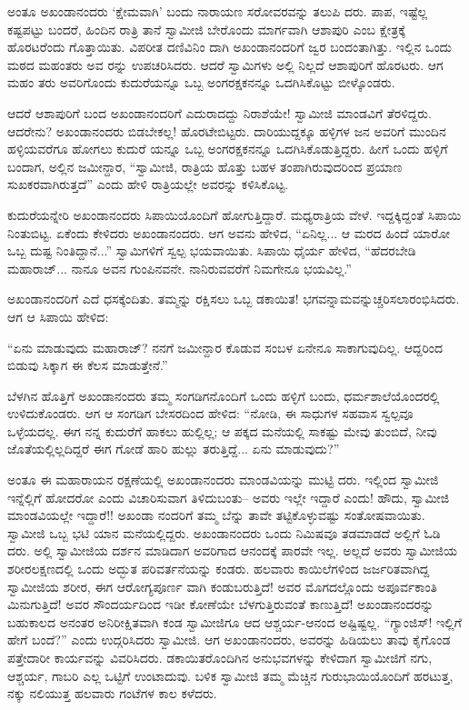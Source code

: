 ಅಂತೂ ಅಖಂಡಾನಂದರು ‘ಕ್ಷೇಮವಾಗಿ’ ಬಂದು ನಾರಾಯಣ ಸರೋವರವನ್ನು ತಲುಪಿ ದರು. ಪಾಪ, ಇಷ್ಟೆಲ್ಲ ಕಷ್ಟಪಟ್ಟು ಬಂದರೆ, ಹಿಂದಿನ ರಾತ್ರಿ ತಾನೆ ಸ್ವಾಮೀಜಿ ಬೇರೊಂದು ಮಾರ್ಗವಾಗಿ ಆಶಾಪುರಿ ಎಂಬ ಕ್ಷೇತ್ರಕ್ಕೆ ಹೊರಟರೆಂದು ಗೊತ್ತಾಯಿತು. ವಿಪರೀತ ದಣಿವಿನಿಂ ದಾಗಿ ಅಖಂಡಾನಂದರಿಗೆ ಜ್ವರ ಬಂದಂತಾಗಿತ್ತು. ಇಲ್ಲಿನ ಒಂದು ಮಠದ ಮಹಂತರು ಅವ ರನ್ನು ಉಪಚರಿಸಿದರು. ಆದರೆ ಸ್ವಾಮಿಗಳು ಅಲ್ಲಿ ನಿಲ್ಲದೆ ಆಶಾಪುರಿಗೆ ಹೊರಟರು. ಆಗ ಮಹಂ ತರು ಅವರಿಗೊಂದು ಕುದುರೆಯನ್ನೂ ಒಬ್ಬ ಅಂಗರಕ್ಷಕನನ್ನೂ ಒದಗಿಸಿಕೊಟ್ಟು ಬೀಳ್ಕೊಂಡರು.

ಆದರೆ ಆಶಾಪುರಿಗೆ ಬಂದ ಅಖಂಡಾನಂದರಿಗೆ ಎದುರಾದದ್ದು ನಿರಾಶೆಯೇ! ಸ್ವಾಮೀಜಿ ಮಾಂಡವಿಗೆ ತೆರಳಿದ್ದರು. ಆದರೇನು? ಅಖಂಡಾನಂದರು ಬಿಡಬೇಕಲ್ಲ! ಹೊರಟೇಬಿಟ್ಟರು. ದಾರಿಯುದ್ದಕ್ಕೂ ಹಳ್ಳಿಗಳ ಜನ ಅವರಿಗೆ ಮುಂದಿನ ಹಳ್ಳಿಯವರೆಗೂ ಹೋಗಲು ಕುದುರೆ ಯನ್ನೂ ಒಬ್ಬ ಅಂಗರಕ್ಷಕನನ್ನೂ ಒದಗಿಸಿಕೊಡುತ್ತಿದ್ದರು. ಹೀಗೆ ಒಂದು ಹಳ್ಳಿಗೆ ಬಂದಾಗ, ಅಲ್ಲಿನ ಜಮೀನ್ದಾರ, “ಸ್ವಾಮೀಜಿ, ರಾತ್ರಿಯ ಹೊತ್ತು ಬಹಳ ತಂಪಾಗಿರುವುದರಿಂದ ಪ್ರಯಾಣ ಸುಖಕರವಾಗಿರುತ್ತದೆ” ಎಂದು ಹೇಳಿ ರಾತ್ರಿಯಲ್ಲೇ ಅವರನ್ನು ಕಳಿಸಿಕೊಟ್ಟ.

ಕುದುರೆಯನ್ನೇರಿ ಅಖಂಡಾನಂದರು ಸಿಪಾಯಿಯೊಂದಿಗೆ ಹೋಗುತ್ತಿದ್ದಾರೆ. ಮಧ್ಯರಾತ್ರಿಯ ವೇಳೆ. ಇದ್ದಕ್ಕಿದ್ದಂತೆ ಸಿಪಾಯಿ ನಿಂತುಬಿಟ್ಟ. ಏಕೆಂದು ಕೇಳಿದರು ಅಖಂಡಾನಂದರು. ಆಗ ಅವನು ಹೇಳಿದ, “ಏನಿಲ್ಲ... ಆ ಮರದ ಹಿಂದೆ ಯಾರೋ ಒಬ್ಬ ದುಷ್ಟ ನಿಂತಿದ್ದಾನೆ...” ಸ್ವಾಮಿಗಳಿಗೆ ಸ್ವಲ್ಪ ಭಯವಾಯಿತು. ಸಿಪಾಯಿ ಧೈರ್ಯ ಹೇಳಿದ, “ಹೆದರಬೇಡಿ ಮಹಾರಾಜ್... ನಾನೂ ಅವನ ಗುಂಪಿನವನೇ. ನಾನಿರುವವರೆಗೆ ನಿಮಗೇನೂ ಭಯವಿಲ್ಲ.”

ಅಖಂಡಾನಂದರಿಗೆ ಎದೆ ಧಸಕ್ಕೆಂದಿತು. ತಮ್ಮನ್ನು ರಕ್ಷಿಸಲು ಒಬ್ಬ ಡಕಾಯಿತ! ಭಗವನ್ನಾಮವನ್ನುಚ್ಚರಿಸಲಾರಂಭಿಸಿದರು. ಆಗ ಆ ಸಿಪಾಯಿ ಹೇಳಿದ:

“ಏನು ಮಾಡುವುದು ಮಹಾರಾಜ್? ನನಗೆ ಜಮೀನ್ದಾರ ಕೊಡುವ ಸಂಬಳ ಏನೇನೂ ಸಾಕಾಗುವುದಿಲ್ಲ. ಆದ್ದರಿಂದ ಬಿಡುವು ಸಿಕ್ಕಾಗ ಈ ಕೆಲಸ ಮಾಡುತ್ತೇನೆ.”

ಬೆಳಗಿನ ಹೊತ್ತಿಗೆ ಅಖಂಡಾನಂದರು ತಮ್ಮ ಸಂಗಡಿಗನೊಂದಿಗೆ ಒಂದು ಹಳ್ಳಿಗೆ ಬಂದು, ಧರ್ಮಶಾಲೆಯೊಂದರಲ್ಲಿ ಉಳಿದುಕೊಂಡರು. ಆಗ ಆ ಸಂಗಡಿಗ ಬೇಸರದಿಂದ ಹೇಳಿದ: “ನೋಡಿ, ಈ ಸಾಧುಗಳ ಸಹವಾಸ ಸ್ವಲ್ಪವೂ ಒಳ್ಳೆಯದಲ್ಲ. ಈಗ ನನ್ನ ಕುದುರೆಗೆ ಹಾಕಲು ಹುಲ್ಲಿಲ್ಲ; ಆ ಪಕ್ಕದ ಮನೆಯಲ್ಲಿ ಸಾಕಷ್ಟು ಮೇವು ತುಂಬಿದೆ, ನೀವು ಜೊತೆಯಲ್ಲಿಲ್ಲದಿದ್ದರೆ ಈಗ ಗೋಡೆ ಹಾರಿ ಹುಲ್ಲು ತರುತ್ತಿದ್ದೆ... ಏನು ಮಾಡುವುದು?”

ಅಂತೂ ಈ ಮಹಾರಾಯನ ರಕ್ಷಣೆಯಲ್ಲಿ ಅಖಂಡಾನಂದರು ಮಾಂಡವಿಯನ್ನು ಮುಟ್ಟಿ ದರು. ಇಲ್ಲಿಂದ ಸ್ವಾಮೀಜಿ ಇನ್ನೆಲ್ಲಿಗೆ ಹೋದರೋ ಎಂದು ವಿಚಾರಿಸುವಾಗ ತಿಳಿದುಬಂತು– ಅವರು ಇಲ್ಲೇ ಇದ್ದಾರೆ ಎಂದು! ಹೌದು, ಸ್ವಾಮೀಜಿ ಮಾಂಡವಿಯಲ್ಲೇ ಇದ್ದಾರೆ!! ಅಖಂಡಾ ನಂದರಿಗೆ ತಮ್ಮ ಬೆನ್ನು ತಾವೇ ತಟ್ಟಿಕೊಳ್ಳುವಷ್ಟು ಸಂತೋಷವಾಯಿತು. ಸ್ವಾಮೀಜಿ ಒಬ್ಬ ಭಟಿ ಯಾನ ಮನೆಯಲ್ಲಿದ್ದರು. ಅಖಂಡಾನಂದರು ಒಂದು ನಿಮಿಷವೂ ತಡಮಾಡದೆ ಅಲ್ಲಿಗೆ ಓಡಿ ದರು. ಅಲ್ಲಿ ಸ್ವಾಮೀಜಿಯ ದರ್ಶನ ಮಾಡಿದಾಗ ಅವರಿಗಾದ ಆನಂದಕ್ಕೆ ಪಾರವೇ ಇಲ್ಲ. ಅಲ್ಲದೆ ಅವರು ಸ್ವಾಮೀಜಿಯ ಶರೀರಲಕ್ಷಣದಲ್ಲಿ ಒಂದು ಅದ್ಭುತ ಪರಿವರ್ತನೆಯನ್ನು ಕಂಡರು. ಹಲವಾರು ಕಾಯಿಲೆಗಳಿಂದ ಜರ್ಜರಿತವಾಗಿದ್ದ ಸ್ವಾಮೀಜಿಯ ಶರೀರ, ಈಗ ಆರೋಗ್ಯಪೂರ್ಣ ವಾಗಿ ಕಂಡುಬರುತ್ತಿದೆ! ಅವರ ಮೊಗದಲ್ಲೊಂದು ಅಪೂರ್ವಕಾಂತಿ ಮಿನುಗುತ್ತಿದೆ! ಅವರ ಸೌಂದರ್ಯದಿಂದ ಇಡೀ ಕೋಣೆಯೇ ಬೆಳಗುತ್ತಿರುವಂತೆ ಕಾಣುತ್ತಿದೆ! ಅಖಂಡಾನಂದರನ್ನು ಬಹುಕಾಲದ ಅನಂತರ ಅನಿರೀಕ್ಷಿತವಾಗಿ ಕಂಡ ಸ್ವಾಮೀಜಿಗೂ ಆದ ಆಶ್ಚರ್ಯ-ಆನಂದ ಅಷ್ಟಿಷ್ಟಲ್ಲ. “ಗ್ಯಾಂಜಿಸ್! ಇಲ್ಲಿಗೆ ಹೇಗೆ ಬಂದೆ?” ಎಂದು ಉದ್ಗರಿಸಿದರು ಸ್ವಾಮೀಜಿ. ಆಗ ಅಖಂಡಾನಂದರು, ಅವರನ್ನು ಹಿಡಿಯಲು ತಾವು ಕೈಗೊಂಡ ಪತ್ತೇದಾರೀ ಕಾರ್ಯವನ್ನು ವಿವರಿಸಿದರು. ಡಕಾಯಿತರೊಂದಿಗಿನ ಅನುಭವಗಳನ್ನು ಕೇಳಿದಾಗ ಸ್ವಾಮೀಜಿಗೆ ನಗು, ಆಶ್ಚರ್ಯ, ಗಾಬರಿ ಎಲ್ಲ ಒಟ್ಟಿಗೆ ಉಂಟಾದುವು. ಬಳಿಕ ಸ್ವಾಮೀಜಿ ತಮ್ಮ ಮೆಚ್ಚಿನ ಗುರುಭಾಯಿಯೊಂದಿಗೆ ಹರಟುತ್ತ, ನಕ್ಕು ನಲಿಯುತ್ತ ಹಲವಾರು ಗಂಟೆಗಳ ಕಾಲ ಕಳೆದರು.

